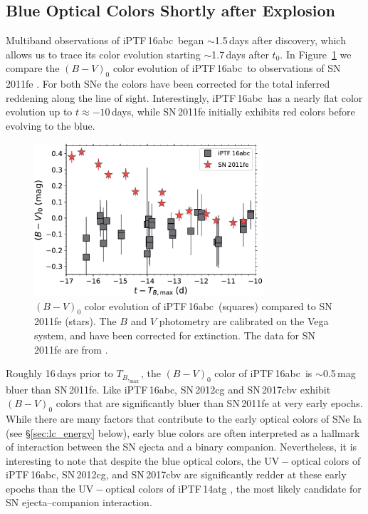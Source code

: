 \documentclass[twocolumn]{aastex61}
\newcommand{\abc}{iPTF\,16abc}
\begin{document}
\subsection{Blue Optical Colors Shortly after Explosion}

Multiband observations of \abc\ began $\sim$1.5\,days after discovery, which
allows us to trace its color evolution starting $\sim$1.7\,days after $t_0$.
In Figure~\ref{fig:B-Vcolors} we compare the $(B - V)_0$ color evolution of
\abc\ to observations of SN\,2011fe \citep{2016ApJ...820...67Z}. For both
SNe the colors have been corrected for the total inferred reddening along
the line of sight. Interestingly, \abc\ has a nearly flat color evolution up
to $t \approx -10$\,days, while SN\,2011fe initially exhibits red colors
before evolving to the blue.

\begin{figure}[]
  \centering
  \includegraphics[width=3.35in]{16abc_11fe_colors.pdf}
  \caption{$(B - V)_0$ color evolution of \abc\ (squares) 
    compared to SN\,2011fe (stars). The $B$ and $V$ photometry are calibrated
    on the Vega system, and have been corrected for extinction. The data for
    SN\,2011fe are from \citet{2016ApJ...820...67Z}.}
  \label{fig:B-Vcolors}
\end{figure}

Roughly 16\,days prior to $T_{B,_\mathrm{max}}$, the $(B - V)_0$ color of
\abc\ is $\sim$0.5\,mag bluer than SN\,2011fe. Like \abc, SN\,2012cg
\citep{2016ApJ...820...92M} and SN\,2017cbv \citep{2017ApJ...845L..11H}
exhibit $(B - V)_0$ colors that are significantly bluer than SN\,2011fe at
very early epochs. While there are many factors that contribute to the early
optical colors of SNe Ia (see \S\ref{sec:lc_energy} below), early blue
colors are often interpreted as a hallmark of interaction between the SN
ejecta and a binary companion. Nevertheless, it is interesting to note that
despite the blue optical colors, the $\mathrm{UV} - \mathrm{optical}$ colors
of \abc, SN\,2012cg, and SN\,2017cbv are significantly redder at these early
epochs than the $\mathrm{UV} - \mathrm{optical}$ colors of iPTF\,14atg
\citep{2015Natur.521..328C}, the most likely candidate for SN
ejecta--companion interaction.
\end{document}

